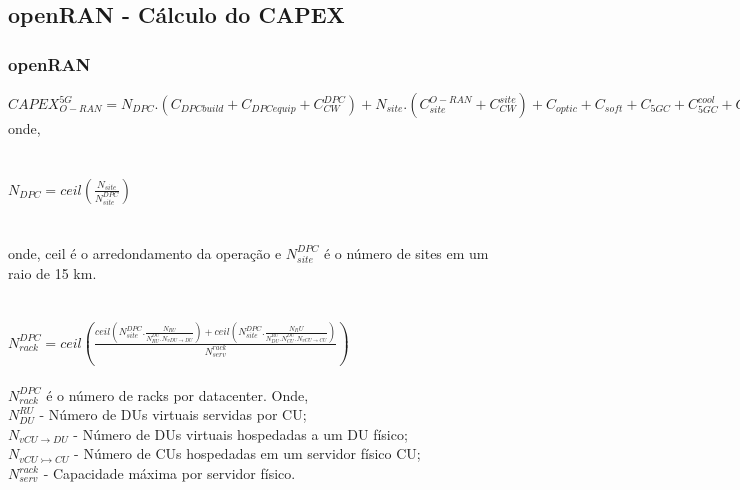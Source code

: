 \documentclass[t]{beamer}
\begin{document}
{\subsection{openRAN - Cálculo do CAPEX}
\begin{frame}
\frametitle{openRAN}
\footnotesize
$CAPEX_{O-RAN}^{5G}=N_{DPC}.(C_{DPCbuild}+C_{DPCequip}+C_{CW}^{DPC})+N_{site}.(C_{site}^{O-RAN}+C_{CW}^{site})+C_{optic}+C_{soft}+C_{5GC}+C_{5GC}^{cool}+C_{CWcore}$\\
onde,\\
\\~\\
 $N_{DPC}=ceil (\frac{N_{site}}{{N_{site}^{DPC}}} )$\\
 \\~\\
onde, ceil é o arredondamento da operação e $N_{site}^{DPC}$ é o número de sites em um raio de 15 km.\\
\\~\\
$N_{rack}^{DPC}=ceil \left( \frac{ceil(N_{site}^{DPC}.\frac{N_{RU}}{N_{RU}^{DU}.N_{vDU\rightarrow DU}})+ceil (N_{site}^{DPC}.\frac{N_RU}{N_{DU}^{RU}.N_{CU}^{DU}.N_{vCU\rightarrow CU}})}{N_{serv}^{rack}} \right)$
\\~\\
$N_{rack}^{DPC}$ é o número de racks por datacenter. Onde, \\
$N_{DU}^{RU}$ - Número de DUs virtuais servidas por CU;\\
$N_{vCU\rightarrow DU} $ - Número de DUs virtuais hospedadas a um DU físico;\\
$N_{vCU\rightarrowtail CU}$ - Número de CUs hospedadas em um servidor físico CU;\\
$N_{serv}^{rack}$ - Capacidade máxima por servidor físico. \\
\end{frame}

}
\end{document}
